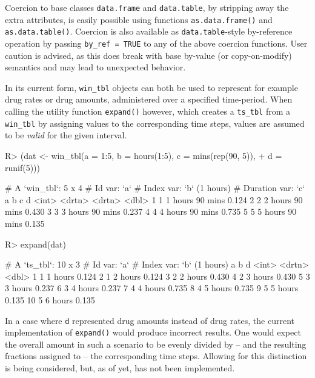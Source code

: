 \documentclass[
  notitle,
  nojss,
  noheadings]{jss}
\begin{document}
Coercion to base classes \texttt{data.frame} and \texttt{data.table}, by
stripping away the extra attributes, is easily possible using functions
\texttt{as.data.frame()} and \texttt{as.data.table()}. Coercion is also
available as \texttt{data.table}-style by-reference operation by passing
\texttt{by\_ref\ =\ TRUE} to any of the above coercion functions. User
caution is advised, as this does break with base  by-value
(or copy-on-modify) semantics and may lead to unexpected behavior.

In its current form, \texttt{win\_tbl} objects can both be used to
represent for example drug rates or drug amounts, administered over a
specified time-period. When calling the utility function
\texttt{expand()} however, which creates a \texttt{ts\_tbl} from a
\texttt{win\_tbl} by assigning values to the corresponding time steps,
values are assumed to be \emph{valid} for the given interval.

\begin{CodeChunk}
\begin{CodeInput}
R> (dat <- win_tbl(a = 1:5, b = hours(1:5), c = mins(rep(90, 5)),
+                 d = runif(5)))
\end{CodeInput}
\begin{CodeOutput}
# A `win_tbl`:  5 x 4
# Id var:       `a`
# Index var:    `b` (1 hours)
# Duration var: `c`
      a b       c           d
  <int> <drtn>  <drtn>  <dbl>
1     1 1 hours 90 mins 0.124
2     2 2 hours 90 mins 0.430
3     3 3 hours 90 mins 0.237
4     4 4 hours 90 mins 0.735
5     5 5 hours 90 mins 0.135
\end{CodeOutput}
\begin{CodeInput}
R> expand(dat)
\end{CodeInput}
\begin{CodeOutput}
# A `ts_tbl`: 10 x 3
# Id var:     `a`
# Index var:  `b` (1 hours)
       a b           d
   <int> <drtn>  <dbl>
 1     1 1 hours 0.124
 2     1 2 hours 0.124
 3     2 2 hours 0.430
 4     2 3 hours 0.430
 5     3 3 hours 0.237
 6     3 4 hours 0.237
 7     4 4 hours 0.735
 8     4 5 hours 0.735
 9     5 5 hours 0.135
10     5 6 hours 0.135
\end{CodeOutput}
\end{CodeChunk}

In a case where \texttt{d} represented drug amounts instead of drug
rates, the current implementation of \texttt{expand()} would produce
incorrect results. One would expect the overall amount in such a
scenario to be evenly divided by -- and the resulting fractions assigned
to -- the corresponding time steps. Allowing for this distinction is
being considered, but, as of yet, has not been implemented.
\end{document}
